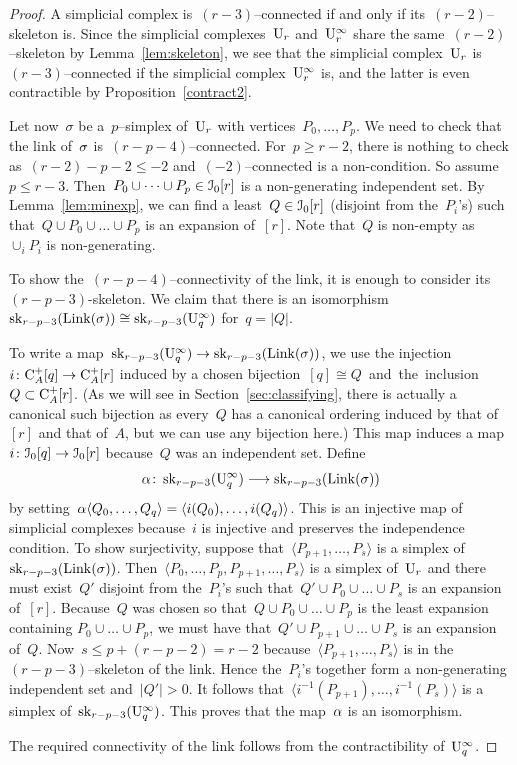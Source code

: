 \begin{proof}
A simplicial complex is~$(r-3)$--connected if and only if its~$(r-2)$--skeleton is. Since the simplicial complexes~$\mathrm{U}_r$ and~$\mathrm{U}_r^\infty$ share the same~$(r-2)$--skeleton by Lemma~\ref{lem:skeleton}, we see that the simplicial complex~$\mathrm{U}_r$ is~\hbox{$(r-3)$}--connected if the simplicial complex~$\mathrm{U}_r^\infty$ is, and the latter is even contractible by Proposition~\ref{contract2}. 

Let now~$\sigma$ be a~$p$--simplex of~$\mathrm{U}_r$  with vertices~$P_0,\dots,P_p$. We need to check that the link of~$\sigma$ is~\hbox{$(r-p-4)$}--connected. 
For~$p\geqslant r-2$, there is nothing to check as~$(r-2)-p-2\leqslant-2$ and~$(-2)$--connected is a non-condition. So assume~$p\leqslant r-3$. Then~$P_0\cup\dots\cup P_p\in \mathcal{I}_0[r]$
is a non-generating independent set. By Lemma~\ref{lem:minexp}, we can find a least~$Q\in \mathcal{I}_0[r]$ 
(disjoint from the~$P_i$'s) such that~$Q\cup P_0\cup \dots\cup P_p$ is an expansion of~$[r]$.   Note that~$Q$ is non-empty as~$\cup_iP_i$ is non-generating. 

To show the~$(r-p-4)$--connectivity of the link, it is enough to consider its~$(r-p-3)$-skeleton. We claim that there is an isomorphism~$\operatorname{sk}_{r-p-3}(\operatorname{Link}(\sigma))\cong\operatorname{sk}_{r-p-3}(\mathrm{U}_{q}^\infty)$ for~$q=|Q|$.  

To write a map~$\operatorname{sk}_{r-p-3}(\mathrm{U}_{q}^\infty)\to\operatorname{sk}_{r-p-3}(\operatorname{Link}(\sigma))$, we use the injection~\hbox{$i\colon\mathrm{C}_A^+[q]\to \mathrm{C}_A^+[r]$} induced by a chosen bijection~\hbox{$[q]\cong Q$ and the inclusion~$Q\subset\mathrm{C}_A^+[r]$}.
(As we will see in Section~\ref{sec:classifying}, there is actually a canonical such bijection as every~$Q$ has a canonical ordering induced by that of~$[r]$ and that of~$A$, but we can use any bijection here.) 
This map induces a map~$i\colon\mathcal{I}_0[q]\to\mathcal{I}_0[r]$ because~$Q$ was an independent set. Define 
\[
\alpha\colon\operatorname{sk}_{r-p-3}(\mathrm{U}_{q}^\infty)\longrightarrow \operatorname{sk}_{r-p-3}(\operatorname{Link}(\sigma))
\]
by setting~$\alpha\langle Q_0,\dots,Q_q\rangle=\langle i(Q_0),\dots,i(Q_q)\rangle$. This is an injective map of simplicial complexes because~$i$ is injective and preserves the independence condition. To show surjectivity, suppose that~$\langle P_{p+1},\dots,P_s\rangle$ is a simplex of~$\operatorname{sk}_{r-p-3}(\operatorname{Link}(\sigma))$. Then~$\langle P_0,\dots,P_p, P_{p+1},\dots,P_s\rangle$ is a simplex of~$\mathrm{U}_r$ and there must exist~$Q'$ disjoint from the~$P_i$'s such that~$Q'\cup P_0\cup \dots\cup P_s$ is an expansion of~$[r]$. Because~$Q$ was chosen so that~\hbox{$Q\cup P_0\cup \dots\cup P_p$} is the least expansion containing 
$P_0\cup \dots\cup P_p$, we must have that~\hbox{$Q'\cup P_{p+1}\cup \dots\cup P_s$} is an expansion of~$Q$. Now~$s\le p+(r-p-2)=r-2$ because~$\langle P_{p+1},\dots,P_s\rangle$ is in the~$(r-p-3)$--skeleton of the link. Hence the~$P_i$'s together form a non-generating independent set and~$|Q'|>0$.  It follows that~$\langle i^{-1}(P_{p+1}),\dots,i^{-1}(P_s)\rangle$ is a simplex of~$\operatorname{sk}_{r-p-3}(\mathrm{U}_{q}^\infty)$. 
This proves that the map~$\alpha$ is an isomorphism. 

The required connectivity of the link follows from the contractibility of~$\mathrm{U}_q^\infty$. 
\end{proof}

